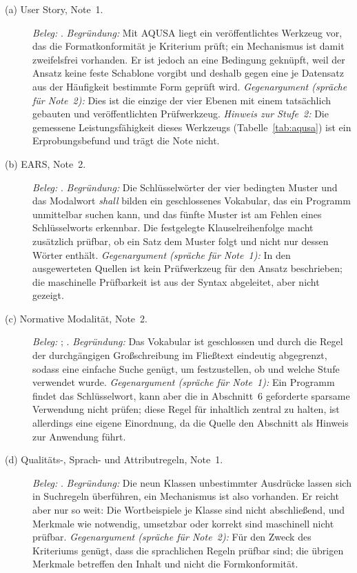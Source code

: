 \documentclass[11pt,a4paper]{report}
\begin{document}
\begin{description}
  \item[(a) User Story, Note~1.]
  \emph{Beleg:} \cite[Abschn.~4, 4.2 und 4.7]{lucassen2016qus}.
  \emph{Begründung:} Mit AQUSA liegt ein veröffentlichtes Werkzeug vor,
  das die Formatkonformität je Kriterium prüft; ein Mechanismus ist
  damit zweifelsfrei vorhanden. Er ist jedoch an eine Bedingung
  geknüpft, weil der Ansatz keine feste Schablone vorgibt und deshalb
  gegen eine je Datensatz aus der Häufigkeit bestimmte Form geprüft
  wird.
  \emph{Gegenargument (spräche für Note~2):} Dies ist die einzige der
  vier Ebenen mit einem tatsächlich gebauten und veröffentlichten
  Prüfwerkzeug.
  \emph{Hinweis zur Stufe~2:} Die gemessene Leistungsfähigkeit dieses
  Werkzeugs (Tabelle~\ref{tab:aqusa}) ist ein Erprobungsbefund und trägt
  die Note nicht.

  \item[(b) EARS, Note~2.]
  \emph{Beleg:} \cite[Abschn.~4.1--4.6]{mavin2009ears}.
  \emph{Begründung:} Die Schlüsselwörter der vier bedingten Muster und
  das Modalwort \emph{shall} bilden ein geschlossenes Vokabular, das ein
  Programm unmittelbar suchen kann, und das fünfte Muster ist am Fehlen
  eines Schlüsselworts erkennbar. Die festgelegte Klauselreihenfolge
  macht zusätzlich prüfbar, ob ein Satz dem Muster folgt und nicht nur
  dessen Wörter enthält.
  \emph{Gegenargument (spräche für Note~1):} In den ausgewerteten
  Quellen ist kein Prüfwerkzeug für den Ansatz beschrieben; die
  maschinelle Prüfbarkeit ist aus der Syntax abgeleitet, aber nicht
  gezeigt.

  \item[(c) Normative Modalität, Note~2.]
  \emph{Beleg:} \cite[Abschn.~1--6]{rfc2119}; \cite[Abschn.~2]{rfc8174}.
  \emph{Begründung:} Das Vokabular ist geschlossen und durch die Regel
  der durchgängigen Großschreibung im Fließtext eindeutig abgegrenzt,
  sodass eine einfache Suche genügt, um festzustellen, ob und welche
  Stufe verwendet wurde.
  \emph{Gegenargument (spräche für Note~1):} Ein Programm findet das
  Schlüsselwort, kann aber die in Abschnitt~6 geforderte sparsame
  Verwendung nicht prüfen; diese Regel für inhaltlich zentral zu halten,
  ist allerdings eine eigene Einordnung, da die Quelle den
  Abschnitt als Hinweis zur Anwendung führt.

  \item[(d) Qualitäts-, Sprach- und Attributregeln, Note~1.]
  \emph{Beleg:} \cite[Abschn.~5.2.5 und 5.2.7]{iso29148}.
  \emph{Begründung:} Die neun Klassen unbestimmter Ausdrücke lassen sich
  in Suchregeln überführen, ein Mechanismus ist also vorhanden. Er
  reicht aber nur so weit: Die Wortbeispiele je Klasse sind nicht
  abschließend, und Merkmale wie notwendig, umsetzbar oder korrekt sind
  maschinell nicht prüfbar.
  \emph{Gegenargument (spräche für Note~2):} Für den Zweck des
  Kriteriums genügt, dass die sprachlichen Regeln prüfbar sind; die
  übrigen Merkmale betreffen den Inhalt und nicht die Formkonformität.
\end{description}
\end{document}
